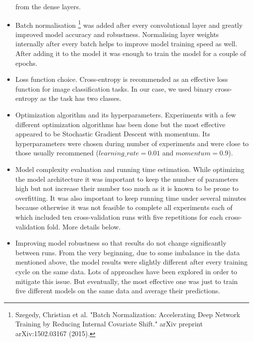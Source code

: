 \documentclass[a4paper]{article}
\begin{document}
\begin{itemize}
    from the dense layers.
    \item Batch normalisation
    \footnote{Szegedy, Christian et al.
        "Batch Normalization: Accelerating Deep Network Training by Reducing Internal Covariate Shift."
        arXiv preprint arXiv:1502.03167 ​(2015).}
    was added after every convolutional layer and greatly improved model accuracy
    and robustness. Normalising layer weights internally after every batch helps to improve model training
    speed as well. After adding it to the model it was enough to train the model for a couple of epochs.
    \item Loss function choice. Cross-entropy is recommended as an effective loss function for image classification
    tasks. In our case, we used binary cross-entropy as the task has two classes.
    \item Optimization algorithm and its hyperparameters. Experiments with a few different optimization algorithms
    has been done but the most effective appeared to be Stochastic Gradient Descent with momentum.
    Its hyperparameters were chosen during number of experiments and were close to those usually recommened
    ($learning\_rate=0.01$ and $momentum=0.9$).
    \item Model complexity evaluation and running time estimation. While optimizing the model architecture it was
    important to keep the number of parameters high but not increase their number too much as it is known to be prone 
    to overfitting. It was also important to keep running time under several minutes because otherwise
    it was not feasible to complete all experiments each of which included ten cross-validation runs
    with five repetitions for each cross-validation fold. More details below.
    \item Improving model robustness so that results do not change significantly between runs. From the very beginning, 
    due to some imbalance in the data mentioned above, the model results were slightly different after
    every training cycle on the same data. Lots of approaches have been explored in order to mitigate this issue.
    But eventually, the most effective one was just to train five different models on the same data and average their predictions.
\end{itemize}
\end{document}
